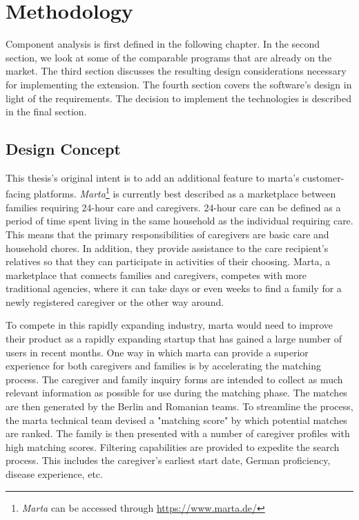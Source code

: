 \newpage
\chapter{Methodology}
Component analysis is first defined in the following chapter. In the second section, we look at some of the comparable programs that are already on the market. The third section discusses the resulting design considerations necessary for implementing the extension. The fourth section covers the software's design in light of the requirements. The decision to implement the technologies is described in the final section.

\section{Design Concept}
This thesis's original intent is to add an additional feature to marta's customer-facing platforms. \emph{Marta}\footnote{\emph{Marta} can be accessed through \url{https://www.marta.de/}} is currently best described as a marketplace between families requiring 24-hour care and caregivers. 24-hour care can be defined as a period of time spent living in the same household as the individual requiring care. This means that the primary responsibilities of caregivers are basic care and household chores. In addition, they provide assistance to the care recipient's relatives so that they can participate in activities of their choosing. Marta, a marketplace that connects families and caregivers, competes with more traditional agencies, where it can take days or even weeks to find a family for a newly registered caregiver or the other way around.

To compete in this rapidly expanding industry, marta would need to improve their product as a rapidly expanding startup that has gained a large number of users in recent months. One way in which marta can provide a superior experience for both caregivers and families is by accelerating the matching process. The caregiver and family inquiry forms are intended to collect as much relevant information as possible for use during the matching phase. The matches are then generated by the Berlin and Romanian teams. To streamline the process, the marta technical team devised a "matching score" by which potential matches are ranked. The family is then presented with a number of caregiver profiles with high matching scores. Filtering capabilities are provided to expedite the search process. This includes the caregiver's earliest start date, German proficiency, disease experience, etc.

